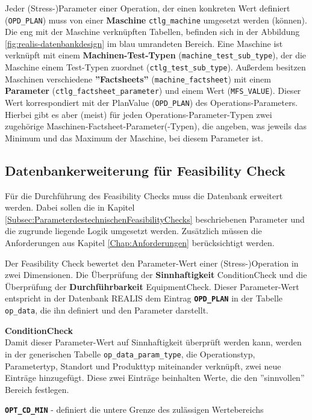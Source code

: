 Jeder (Stress-)Parameter einer Operation, der einen konkreten Wert definiert (\texttt{OPD\_PLAN}) muss von einer \textbf{Maschine} \texttt{ctlg\_machine} umgesetzt werden (können). Die eng mit der Maschine verknüpften Tabellen, befinden sich in der Abbildung \ref{fig:realis-datenbankdesign} im blau umrandeten Bereich. Eine Maschine ist verknüpft mit einem \textbf{Machinen-Test-Typen} (\texttt{machine\_test\_sub\_type}), der die Maschine einem Test-Typen zuordnet (\texttt{ctlg\_test\_sub\_type}). Außerdem besitzen Maschinen verschiedene \textbf{''Factsheets''} (\texttt{machine\_factsheet}) mit einem \textbf{Parameter} (\texttt{ctlg\_factsheet\_parameter}) und einem Wert (\texttt{MFS\_VALUE}). Dieser Wert korrespondiert mit der PlanValue (\texttt{OPD\_PLAN}) des Operations-Parameters. Hierbei gibt es aber (meist) für jeden Operations-Parameter-Typen zwei zugehörige Maschinen-Factsheet-Parameter(-Typen), die angeben, was jeweils das Minimum und das Maximum der Maschine, bei diesem Parameter ist.


\subsection{Datenbankerweiterung für Feasibility Check}

Für die Durchführung des Feasibility Checks muss die Datenbank erweitert werden. Dabei sollen die in Kapitel \ref{Subsec:ParameterdestechnischenFeasibilityChecks} beschriebenen Parameter und die zugrunde liegende Logik umgesetzt werden. Zusätzlich müssen die Anforderungen aus Kapitel \ref{Chap:Anforderungen} berücksichtigt werden.

Der Feasibility Check bewertet den Parameter-Wert einer (Stress-)Operation in zwei Dimensionen. Die Überprüfung der \textbf{Sinnhaftigkeit} \gls{ConditionCheck} und die Überprüfung der \textbf{Durchführbarkeit} \gls{EquipmentCheck}.
Dieser Parameter-Wert entspricht in der Datenbank REALIS dem Eintrag \textbf{\texttt{OPD\_PLAN}} in der Tabelle \texttt{op\_data}, die ihn definiert und den Parameter darstellt.

\textbf{\gls{ConditionCheck}} \\
Damit dieser Parameter-Wert auf Sinnhaftigkeit überprüft werden kann, werden in der generischen Tabelle \texttt{op\_data\_param\_type}, die Operationstyp, Parametertyp,  Standort und Produkttyp miteinander verknüpft, zwei neue Einträge hinzugefügt. Diese zwei Einträge beinhalten Werte, die den ''sinnvollen'' Bereich festlegen.

\setlength{\leftskip}{1em} 
\textbf{\texttt{OPT\_CD\_MIN}} - definiert die untere Grenze des zulässigen Wertebereichs


